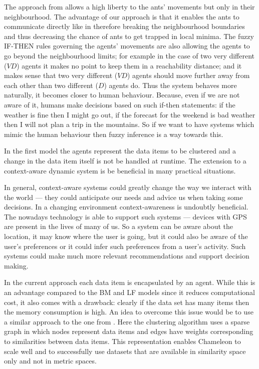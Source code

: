 The approach from \cite{Chen04AnAdaptive} allows a high liberty to the ants' movements but only in their neighbourhood. The advantage of our approach is that it enables the  ants to communicate directly like in \cite{Chira07Stigmergic} therefore breaking the neighbourhood boundaries and thus decreasing the chance of ants to get trapped in local minima. The fuzzy IF-THEN rules governing the agents' movements are also allowing the agents to go beyond the neighbourhood limits; for example in the case of two very different ($VD$) agents it makes no point to keep them in a reachability distance; and it makes sense that two very different ($VD$) agents should move further away from each other than two different ($D$) agents do. Thus the system behaves more naturally, it becomes closer to human behaviour. Because, even if we are not aware of it, humans make decisions based on such if-then statements: if the weather is fine then I might go out, if the forecast for the weekend is bad weather then I will not plan a trip in the mountains. So if we want to have systems which mimic the human behaviour then fuzzy inference is a way towards this.

In the first model the agents represent the data items to be clustered and a change in the data item itself is not be handled at runtime. The extension to a context-aware dynamic system is be beneficial in many practical situations. 

In general, context-aware systems could greatly change the way we interact with the world — they could anticipate our needs and advice us when taking some decisions. In a changing environment context-awareness is undoubtly beneficial. The nowadays technology is able to support such systems --- devices with GPS are present in the lives of many of us. So a system can be aware about the location, it may know where the user is going, but  it could also be aware of the user's preferences or it could infer such preferences from a user's activity. Such systems could make much more relevant recommendations and support decision making. 

In the current approach each data item is encapsulated by an agent. While this is an advantage compared to the BM and LF models \cite{Deneubourg91TheDynamic,Lumer94Diversity} since it reduces computational cost, it also comes with a drawback: clearly if the data set has many items then the memory consumption is high.  An idea to overcome this issue would be to use a similar approach to the one from \cite{Karypis99Chameleon}. Here the clustering algorithm uses a sparse graph in which nodes represent data items  and edges have weights corresponding to similarities between data items. This representation enables Chameleon \cite{Karypis99Chameleon} to scale well and to successfully use datasets that are available in similarity space only  and not in metric spaces. 



